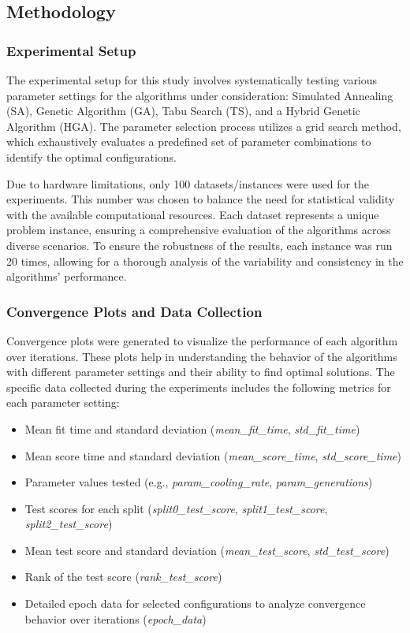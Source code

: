 \documentclass[
]{article}
\begin{document}
    \subsection{Methodology}

    \subsubsection{Experimental Setup}

    The experimental setup for this study involves systematically testing various parameter settings for the algorithms under consideration: Simulated Annealing (SA), Genetic Algorithm (GA), Tabu Search (TS), and a Hybrid Genetic Algorithm (HGA). The parameter selection process utilizes a grid search method, which exhaustively evaluates a predefined set of parameter combinations to identify the optimal configurations.

    Due to hardware limitations, only 100 datasets/instances were used for the experiments. This number was chosen to balance the need for statistical validity with the available computational resources. Each dataset represents a unique problem instance, ensuring a comprehensive evaluation of the algorithms across diverse scenarios. To ensure the robustness of the results, each instance was run 20 times, allowing for a thorough analysis of the variability and consistency in the algorithms' performance.

    \subsubsection{Convergence Plots and Data Collection}

    Convergence plots were generated to visualize the performance of each algorithm over iterations. These plots help in understanding the behavior of the algorithms with different parameter settings and their ability to find optimal solutions. The specific data collected during the experiments includes the following metrics for each parameter setting:

    \begin{itemize}
        \item Mean fit time and standard deviation (\textit{mean\_fit\_time}, \textit{std\_fit\_time})
        \item Mean score time and standard deviation (\textit{mean\_score\_time}, \textit{std\_score\_time})
        \item Parameter values tested (e.g., \textit{param\_cooling\_rate}, \textit{param\_generations})
        \item Test scores for each split (\textit{split0\_test\_score}, \textit{split1\_test\_score}, \textit{split2\_test\_score})
        \item Mean test score and standard deviation (\textit{mean\_test\_score}, \textit{std\_test\_score})
        \item Rank of the test score (\textit{rank\_test\_score})
        \item Detailed epoch data for selected configurations to analyze convergence behavior over iterations (\textit{epoch\_data})
    \end{itemize}
\end{document}
